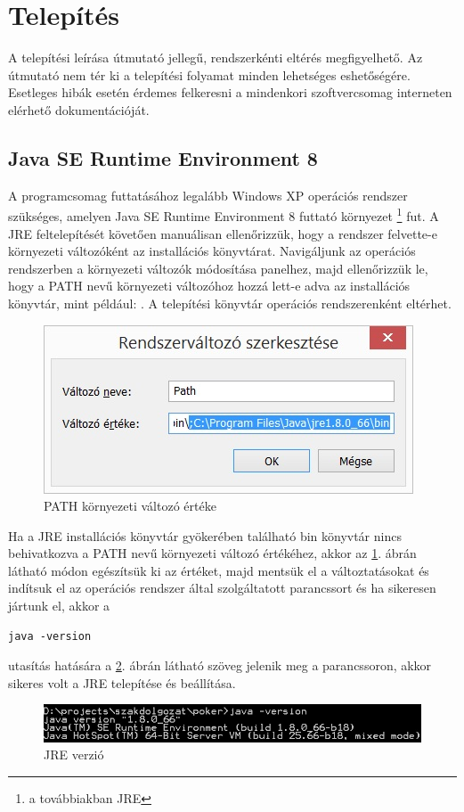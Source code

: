 \section{Telepítés}
A telepítési leírása útmutató jellegű, rendszerkénti eltérés megfigyelhető. Az útmutató nem tér ki a telepítési folyamat minden lehetséges eshetőségére. Esetleges hibák esetén érdemes felkeresni a mindenkori szoftvercsomag interneten elérhető dokumentációját.

\subsection{Java SE Runtime Environment 8}
A programcsomag futtatásához legalább Windows XP operációs rendszer szükséges, amelyen Java SE Runtime Environment 8 futtató környezet \footnote{a továbbiakban JRE} \cite{jresite} fut. A JRE feltelepítését követően manuálisan ellenőrizzük, hogy a rendszer felvette-e környezeti változóként az installációs könyvtárat. Navigáljunk az operációs rendszerben a környezeti változók módosítása panelhez, majd ellenőrizzük le, hogy a PATH nevű környezeti változóhoz hozzá lett-e adva az installációs könyvtár, mint például: . A telepítési könyvtár operációs rendszerenként eltérhet.

\begin{figure}[h!]
  \caption{PATH környezeti változó értéke}
  \label{fig:path_env}
  \centering
    \includegraphics{user-documentation/images/path_env.jpg}
\end{figure}

Ha a JRE installációs könyvtár gyökerében található bin könyvtár nincs behivatkozva a PATH nevű környezeti változó értékéhez, akkor az \ref{fig:path_env}. ábrán látható módon egészítsük ki az értéket, majd mentsük el a változtatásokat és indítsuk el az operációs rendszer által szolgáltatott parancssort és ha sikeresen jártunk el, akkor a

\begin{Verbatim}[xleftmargin=.5in]
java -version
\end{Verbatim}
utasítás hatására a \ref{fig:jre_version}. ábrán látható szöveg jelenik meg a parancssoron, akkor sikeres volt a JRE telepítése és beállítása.
\begin{figure}[h!]
  \caption{JRE verzió}
  \label{fig:jre_version}
  \centering
    \includegraphics[width=14cm]{user-documentation/images/java_version.jpg}
\end{figure}
 
